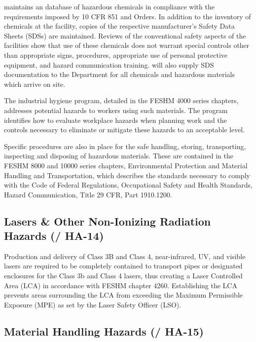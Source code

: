 \fnal maintains an database of hazardous chemicals in compliance
with the requirements imposed by 10 CFR 851 and  Orders. In
addition to the inventory of chemicals at the facility, copies of the
respective manufacturer's Safety Data Sheets (SDSs) are
maintained. Reviews of the conventional safety aspects of the
facilities show that use of these chemicals does not warrant special
controls other than appropriate signs, procedures, appropriate use of
personal protective equipment, and hazard communication training. 
will also supply SDS documentation to the \surf {} Department for all
chemicals and hazardous materials which arrive on site.

The industrial hygiene program, detailed in the FESHM 4000 series
chapters, addresses potential hazards to workers using such
materials. The program identifies how to evaluate workplace hazards
when planning work and the controls necessary to eliminate or mitigate
these hazards to an acceptable level.

Specific procedures are also in place for the safe handling, storing,
transporting, inspecting and disposing of hazardous materials. These
are contained in the FESHM 8000 and 10000 series chapters,
Environmental Protection and Material Handling and Transportation,
which describes the standards necessary to comply with the Code of
Federal Regulations, Occupational Safety and Health Standards, Hazard
Communication, Title 29 CFR, Part 1910.1200.


\subsection{Lasers \& Other Non-Ionizing Radiation Hazards (/ HA-14)}

Production and delivery of Class 3B and Class 4, near-infrared, UV,
and visible lasers are required to be completely contained to
transport pipes or designated enclosures for the Class 3b and Class 4
lasers, thus creating a Laser Controlled Area (LCA) in accordance with
FESHM chapter 4260.  Establishing the LCA prevents areas surrounding
the LCA from exceeding the Maximum Permissible Exposure (MPE) as set
by the Laser Safety Officer (LSO).

\subsection{Material Handling Hazards (/ HA-15)}

